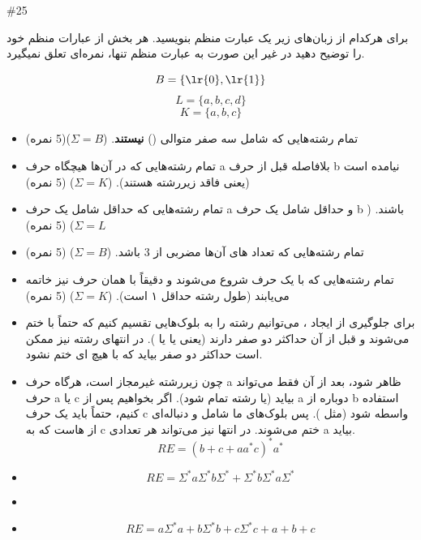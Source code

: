 \question#{25}

برای هرکدام از زبان‌های زیر یک عبارت منظم  بنویسید. هر بخش از عبارات منظم خود را توضیح دهید در غیر این صورت به عبارت منظم تنها، نمره‌ای تعلق نمیگیرد.

$$B = \{\text{\lr{0}} , \text{\lr{1}}\}$$
$$L = \{a,b,c,d\}$$
$$K = \{a,b,c\}$$


\begin{itemize}
    \item[\textbf{(a}]
          تمام رشته‌هایی که شامل سه صفر متوالی () \textbf{نیستند}. ($\Sigma = B$)(5 نمره)
    \item[\textbf{(b}]
          تمام رشته‌هایی که در آن‌ها هیچگاه حرف a بلافاصله قبل از حرف b نیامده است (یعنی فاقد زیررشته  هستند). ($\Sigma = K$) (5 نمره)
    \item[\textbf{(c}]
          تمام رشته‌هایی که حداقل شامل یک حرف a و حداقل شامل یک حرف b باشند. ($\Sigma = L$) (5 نمره)
    \item[\textbf{(d}]
          تمام رشته‌هایی که تعداد های آن‌ها مضربی از 3 باشد. ($\Sigma = B$) (5 نمره)
    \item[\textbf{(e}]
          تمام رشته‌هایی که با یک حرف شروع می‌شوند و دقیقاً با همان حرف نیز خاتمه می‌یابند (طول رشته حداقل ۱ است). ($\Sigma = K$) (5 نمره)

\end{itemize}

\ifcompileanswers\solution

    \begin{itemize}
        \item[\textbf{(a}]
              برای جلوگیری از ایجاد ، می‌توانیم رشته را به بلوک‌هایی تقسیم کنیم که حتماً با  ختم می‌شوند و قبل از آن حداکثر دو صفر دارند (یعنی  یا  یا ). در انتهای رشته نیز ممکن است حداکثر دو صفر بیاید که با هیچ ای ختم نشود.
        \item[\textbf{(b}]
              چون زیررشته  غیرمجاز است، هرگاه حرف a ظاهر شود، بعد از آن فقط می‌تواند حرف a یا c بیاید (یا رشته تمام شود). اگر بخواهیم پس از a دوباره از b استفاده کنیم، حتماً باید یک حرف c واسطه شود (مثل ). پس بلوک‌های ما شامل  و دنباله‌ای از هاست که به c ختم می‌شوند. در انتها نیز می‌تواند هر تعدادی a بیاید.
              $$RE = (b + c + aa^*c)^*a^*$$
        \item[\textbf{(c}]
              $$RE = \Sigma^* a \Sigma^* b \Sigma^* + \Sigma^* b \Sigma^* a \Sigma^*$$
        \item[\textbf{(d}]
        \item[\textbf{(e}]
              $$RE = a\Sigma^*a + b\Sigma^*b + c\Sigma^*c + a + b + c$$

    \end{itemize}

\fi
